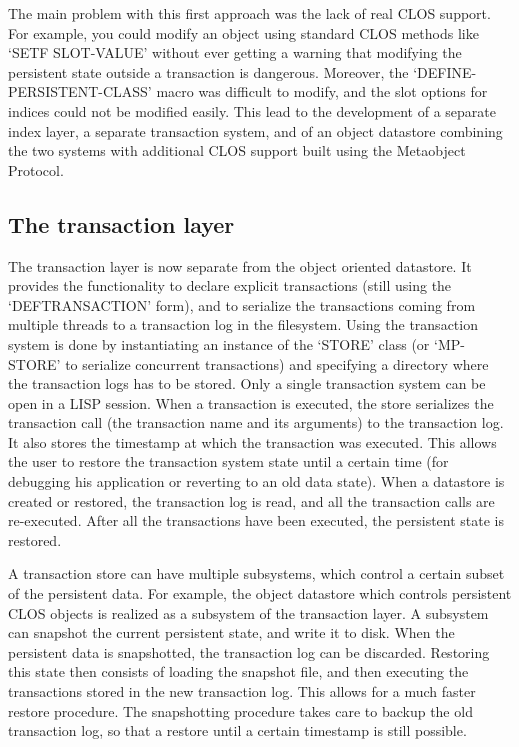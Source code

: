 The main problem with this first approach was the lack of real CLOS
support. For example, you could modify an object using standard CLOS
methods like `SETF SLOT-VALUE' without ever getting a warning that
modifying the persistent state outside a transaction is
dangerous. Moreover, the `DEFINE-PERSISTENT-CLASS' macro was difficult
to modify, and the slot options for indices could not be modified
easily. This lead to the development of a separate index layer, a
separate transaction system, and of an object datastore combining the
two systems with additional CLOS support built using the Metaobject
Protocol.

\subsection{The transaction layer}

The transaction layer is now separate from the object oriented
datastore. It provides the functionality to declare explicit
transactions (still using the `DEFTRANSACTION' form), and to serialize
the transactions coming from multiple threads to a transaction log in
the filesystem. Using the transaction system is done by instantiating
an instance of the `STORE' class (or `MP-STORE' to serialize
concurrent transactions) and specifying a directory where the
transaction logs has to be stored. Only a single transaction system
can be open in a LISP session. When a transaction is executed, the
store serializes the transaction call (the transaction name and its
arguments) to the transaction log. It also stores the timestamp at
which the transaction was executed. This allows the user to restore
the transaction system state until a certain time (for debugging his
application or reverting to an old data state). When a datastore is
created or restored, the transaction log is read, and all the
transaction calls are re-executed. After all the transactions have
been executed, the persistent state is restored.

A transaction store can have multiple subsystems, which control a
certain subset of the persistent data. For example, the object
datastore which controls persistent CLOS objects is realized as a
subsystem of the transaction layer. A subsystem can snapshot the
current persistent state, and write it to disk. When the persistent
data is snapshotted, the transaction log can be discarded. Restoring
this state then consists of loading the snapshot file, and then
executing the transactions stored in the new transaction log. This
allows for a much faster restore procedure. The snapshotting procedure
takes care to backup the old transaction log, so that a restore until
a certain timestamp is still possible.

